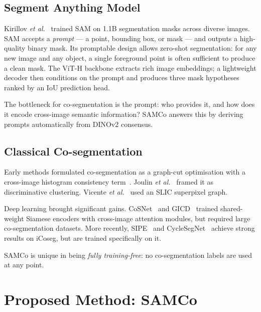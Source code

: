 \documentclass[10pt,twocolumn,letterpaper]{article}
\begin{document}
\subsection{Segment Anything Model}

Kirillov \emph{et al.}~\cite{kirillov2023sam} trained SAM on 1.1B
segmentation masks across diverse images.
SAM accepts a \emph{prompt} — a point, bounding box, or mask — and outputs a
high-quality binary mask.
Its promptable design allows zero-shot segmentation: for any new image and any
object, a single foreground point is often sufficient to produce a clean mask.
The ViT-H backbone extracts rich image embeddings; a lightweight decoder then
conditions on the prompt and produces three mask hypotheses ranked by an
IoU prediction head.

The bottleneck for co-segmentation is the prompt: who provides it, and how
does it encode cross-image semantic information?
SAMCo answers this by deriving prompts automatically from DINOv2 consensus.

\subsection{Classical Co-segmentation}

Early methods formulated co-segmentation as a graph-cut optimisation with a
cross-image histogram consistency term~\cite{rother2006cosegmentation}.
Joulin \emph{et al.}~\cite{joulin2012multi} framed it as discriminative clustering.
Vicente \emph{et al.}~\cite{vicente2011object} used an SLIC superpixel graph.

Deep learning brought significant gains.
CoSNet~\cite{li2019cosegnet} and GICD~\cite{zhang2020gradient} trained
shared-weight Siamese encoders with cross-image attention modules, but required
large co-segmentation datasets.
More recently, SIPE~\cite{fan2022sipe} and CycleSegNet~\cite{wu2023cycleseg}
achieve strong results on iCoseg, but are trained specifically on it.

SAMCo is unique in being \emph{fully training-free}: no co-segmentation
labels are used at any point.

\section{Proposed Method: SAMCo}
\label{sec:method}
\end{document}
